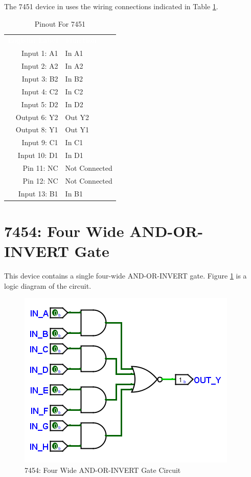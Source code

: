 The 7451 device in \LE uses the wiring connections indicated in Table \ref{tab:50-7451}.

\begin{table}[H]
	\sffamily
	\newcommand{\head}[1]{\textcolor{white}{\textbf{#1}}}		
	\begin{center}
		\begin{tabular}{rl} 
			\rowcolor{black!75}
			\head{Logisim Label} & \head{Function} \\
			Input 1: A1   & In A1         \\
			Input 2: A2   & In A2         \\
			Input 3: B2   & In B2         \\
			Input 4: C2   & In C2         \\
			Input 5: D2   & In D2         \\
			Output 6: Y2  & Out Y2        \\
			Output 8: Y1  & Out Y1        \\
			Input 9: C1   & In C1         \\
			Input 10: D1  & In D1         \\
			Pin 11: NC    & Not Connected \\
			Pin 12: NC    & Not Connected \\
			Input 13: B1  & In B1         \\
		\end{tabular}
	\end{center}
	\caption{Pinout For 7451}
	\label{tab:50-7451}
\end{table}

\section{7454: Four Wide AND-OR-INVERT Gate}

This device contains a single four-wide AND-OR-INVERT gate. Figure \ref{fig:app_ttl-7454} is a logic diagram of the circuit.

\begin{figure}[H]
	\centering
	\includegraphics{gfx/app_ttl-7454}
	\caption{7454: Four Wide AND-OR-INVERT Gate Circuit}
	\label{fig:app_ttl-7454}
\end{figure}

